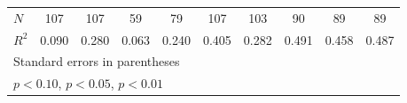 {\begin{tabular}{l*{9}{c}}
\hline
\(N\)       &         107         &         107         &          59         &          79         &         107         &         103         &          90         &          89         &          89         \\
\(R^{2}\)   &       0.090         &       0.280         &       0.063         &       0.240         &       0.405         &       0.282         &       0.491         &       0.458         &       0.487         \\
\hline\hline
\multicolumn{10}{l}{\footnotesize Standard errors in parentheses}\\
\multicolumn{10}{l}{\footnotesize \sym{*} \(p<0.10\), \sym{**} \(p<0.05\), \sym{***} \(p<0.01\)}\\
\end{tabular}
}
